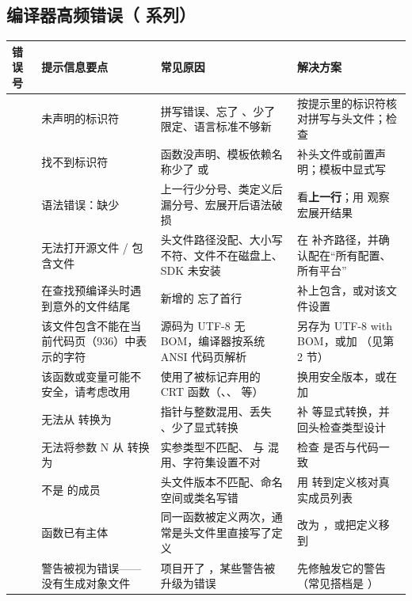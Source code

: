 \subsection{编译器高频错误（ 系列）}
\begin{longtable}{L{1.6cm}L{3.4cm}L{3.6cm}L{5.6cm}}
\toprule
\textbf{错误号} & \textbf{提示信息要点} & \textbf{常见原因} & \textbf{解决方案} \\ \midrule
\endhead \bottomrule \endlastfoot
{} & 未声明的标识符 & 拼写错误、忘了 、少了  限定、语言标准不够新 & 按提示里的标识符核对拼写与头文件；检查  \\
 & 找不到标识符 & 函数没声明、模板依赖名称少了  或  & 补头文件或前置声明；模板中显式写  \\
 & 语法错误：缺少 \code{;} & 上一行少分号、类定义后漏分号、宏展开后语法破损 & 看\textbf{上一行}；用  观察宏展开结果 \\
 & 无法打开源文件 / 包含文件 & 头文件路径没配、大小写不符、文件不在磁盘上、SDK 未安装 & 在  补齐路径，并确认配在“所有配置、所有平台” \\
 & 在查找预编译头时遇到意外的文件结尾 & 新增的  忘了首行  & 补上包含，或对该文件设置  \\
 & 该文件包含不能在当前代码页（936）中表示的字符 & 源码为 UTF-8 无 BOM，编译器按系统 ANSI 代码页解析 & 另存为 UTF-8 with BOM，或加 （见第 2 节） \\
 & 该函数或变量可能不安全，请考虑改用  & 使用了被标记弃用的 CRT 函数（、、 等） & 换用安全版本，或在  加  \\
 & 无法从  转换为  & 指针与整数混用、丢失 、少了显式转换 & 补  等显式转换，并回头检查类型设计 \\
 & 无法将参数 N 从  转换为  & 实参类型不匹配、 与  混用、字符集设置不对 & 检查  是否与代码一致 \\
 &  不是  的成员 & 头文件版本不匹配、命名空间或类名写错 & 用  转到定义核对真实成员列表 \\
 & 函数已有主体 & 同一函数被定义两次，通常是头文件里直接写了定义 & 改为 ，或把定义移到  \\
 & 警告被视为错误——没有生成对象文件 & 项目开了 ，某些警告被升级为错误 & 先修触发它的警告（常见搭档是 ） \\
\end{longtable}
